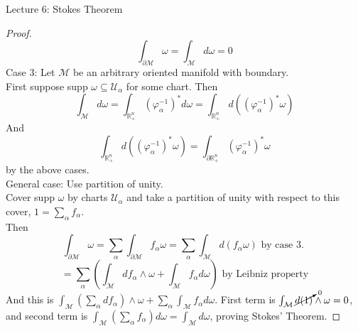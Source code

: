 \documentclass[10pt]{article}
\theoremstyle{plain}
\theoremstyle{definition}
\newcommand{\Real}{\mathbb{R}}
\newcommand{\man}{\mathcal{M}}
\newcommand{\chartU}{\mathcal{U}}
\newcommand{\chart}{\varphi}
\newcommand{\df}{df}
\newcommand{\dw}{d\omega}
\newcommand{\sumfromto}[2]{\sum\limits_{#1}^{#2}}
\newcommand{\plusReal}{\Real_+ ^n}
\begin{document}
\begin{section}{Lecture 6: Stokes Theorem}
\begin{proof}
$$\int_{\partial \man} \omega = \int_\man \dw = 0$$
Case 3: Let $\man$ be an arbitrary oriented manifold with boundary.\\
First suppose supp $\omega \subseteq \chartU _\alpha$ for some chart. Then
$$\int_\man \dw = \int_{\plusReal} (\chart_\alpha^{-1})^* \dw = \int_{\plusReal} d((\chart_{\alpha} ^{-1})^* \omega)$$
And $$ \int_{\plusReal} d ((\chart_\alpha^{-1})^* \omega ) =  \int_{\partial\plusReal} ( \chart_\alpha ^{-1} )^* \omega$$
by the above cases.\\
General case: Use partition of unity.\\
Cover supp $\omega$ by charts $\chartU_\alpha$ and take a partition of unity with respect to this cover, $1 = \sumfromto{\alpha}{} f_\alpha$.\\
Then $$\int_{\partial \man} \omega = \sumfromto{\alpha}{} \int_{\partial \man} f_\alpha \omega = \sumfromto{\alpha}{} \int_\man d(f_\alpha \omega) \text{ by case 3. }$$
 $$ = \sumfromto{\alpha}{} \left( \int_\man \df_\alpha \wedge \omega + \int_\man f_\alpha \dw\right) \text{ by Leibniz property}$$
And this is $\int_\man (\sumfromto{\alpha}{}\df _\alpha)\wedge \omega + \sumfromto{\alpha}{}\int_\man f_\alpha \dw$. First term is $\int_\man \cancelto{0}{d(1)}\wedge \omega = 0$, and second term is $\int_\man (\sumfromto{\alpha}{}f_\alpha) \dw = \int_\man \dw$, proving Stokes' Theorem.
\end{proof}
\end{section}
\end{document}
